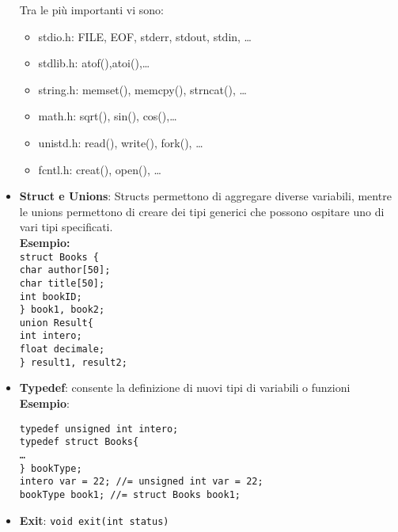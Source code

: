 \begin{flushleft}
\begin{itemize}
          Tra le più importanti vi sono:
          \begin{itemize}
            \item stdio.h: FILE, EOF, stderr, stdout, stdin, \dots 
            \item stdlib.h: atof(),atoi(),\dots
            \item string.h: memset(), memcpy(), strncat(), \dots 
            \item math.h: sqrt(), sin(), cos(),\dots 
            \item unistd.h: read(), write(), fork(), \dots 
            \item fcntl.h: creat(), open(), \dots 
          \end{itemize}
    \item \textbf{Struct e Unions}: Structs permettono di aggregare diverse variabili, mentre le unions permettono di 
          creare dei tipi generici che possono ospitare uno di vari tipi specificati.\\
          \textbf{Esempio:}\\
            \texttt{struct Books \{ \\
            \tab char author[50]; \\
            \tab char title[50]; \\
            \tab int bookID; \\
            \} book1, book2; } \\
            \texttt{union Result\{ \\
              \tab int intero;\\
              \tab float decimale;\\
              \} result1, result2; } 
    \item \textbf{Typedef}: consente la definizione di nuovi tipi di variabili o funzioni
            \textbf{Esempio}:
            \begin{flushleft}
              \texttt{typedef unsigned int intero; \\
                typedef struct Books\{ \\
                \dots \\
                \} bookType; \\
                intero var = 22; //= unsigned int var = 22; \\
                bookType book1; //= struct Books book1;\\
              } 
            \end{flushleft}
    \item \textbf{Exit}: \texttt{void exit(int status)}\\

\end{itemize}
\end{flushleft}
